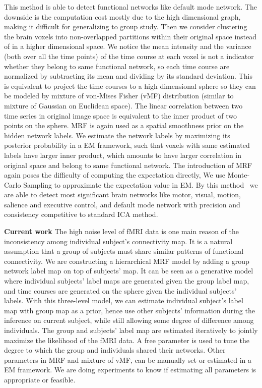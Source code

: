 \documentclass[]{article}
\begin{document}
This method is able to detect functional networks like default mode network. The
downside is the computation cost mostly due to the high dimensional graph,
making it difficult for generalizing to group study. Then we consider clustering
the brain voxels into non-overlapped partitions within their original space
instead of in a higher dimensional space. We notice the mean intensity and the
variance (both over all the time points) of the time course at each voxel is not
a indicator whether they belong to same functional network, so each time course
are normalized by subtracting its mean and dividing by its standard
deviation. This is equivalent to project the time courses to a high dimensional
sphere so they can be modeled by mixture of von-Mises Fisher (vMF) distribution
(similar to mixture of Gaussian on Euclidean space). The linear correlation
between two time series in original image space is equivalent to the inner
product of two points on the sphere.  MRF is again used as a spatial smoothness
prior on the hidden network labels. We estimate the network labels by maximizing
its posterior probability in a EM framework, such that voxels with same
estimated labels have larger inner product, which amounts to have larger
correlation in original space and belong to same functional network. The
introduction of MRF again poses the difficulty of computing the expectation
directly, We use Monte-Carlo Sampling to approximate the expectation value
in EM. By this method~\cite{SCI:Liu2011a} we are able to detect most significant
brain networks like motor, visual, motion, salience and executive control, and
default mode network with precision and consistency  competitive to standard ICA method.

\textbf{Current work} The high noise level of fMRI data is one main reason of
the inconsistency among individual subject's connectivity map. It is a natural
assumption that a group of subjects must share similar patterns of functional
connectivity. We are constructing a hierarchical MRF model by adding a group
network label map on top of subjects' map. It can be seen as a generative model
where individual subjects' label maps are generated given the group label map,
and time courses are generated on the sphere given the individual subjects'
labels. With this three-level model, we can estimate individual subject's label
map with group map as a prior, hence use other subjects' information during the
inference on current subject, while still allowing some degree of difference
among individuals. The group and subjects' label map are estimated iteratively
to jointly maximize the likelihood of the fMRI data. A free parameter is used to
tune the degree to which the group and individuals shared their networks. Other
parameters in MRF and mixture of vMF, can be manually set or estimated in a EM
framework. We are doing experiments to know if estimating all parameters is
appropriate or feasible.
\end{document}
